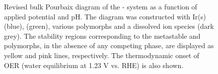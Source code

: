 \begin{figure}[!htb]
\centering
{}
\caption{\label{fig:bulk_pourbaix}
%
Revised bulk Pourbaix diagram of the - system as a function of applied potential and pH.
%
The diagram was constructed with Ir(s) (blue), \rIrOtwo (green), various \IrOthree polymorphs and a dissolved  ion species (dark grey).
%
The stability regions corresponding to the metastable \rIrOthree and \bIrOthree polymorphs, in the absence of any competing \IrOthree phase, are displayed as yellow and pink lines, respectively.
%
The thermodynamic onset of OER (water equilibrium at 1.23 V vs. RHE) is also shown.
%
%
}
\end{figure}


